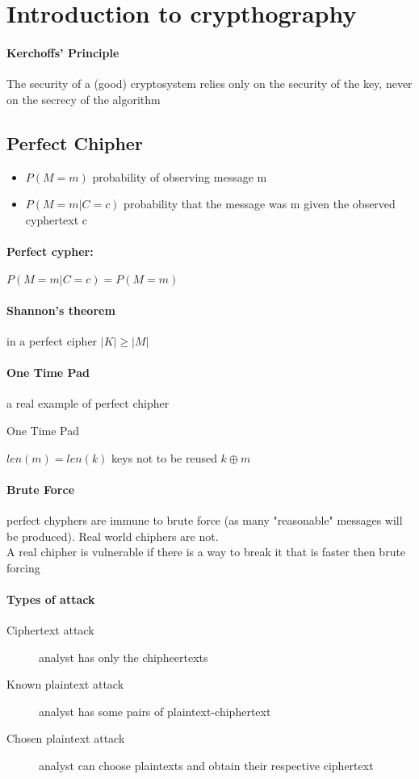 \documentclass{article}
\newcommand{\xor}{\oplus}
\begin{document}
\section{Introduction to crypthography}
\paragraph{Kerchoffs' Principle} The security of a (good) cryptosystem relies only on the security of the key, never on the secrecy of the algorithm
\subsection{Perfect Chipher}
\begin{itemize}
\item $P(M=m)$ probability of observing message m
\item $P(M=m|C=c)$ probability that the message was m given the observed cyphertext c
\end{itemize}
\paragraph{Perfect cypher: } $P(M=m|C=c)=P(M=m)$
\paragraph{Shannon's theorem} in a perfect cipher $|K|\geq |M|$
\paragraph{One Time Pad} a real example of perfect chipher
\begin{algorithm}
\caption{One Time Pad}
\begin{algorithmic}
\REQUIRE $len(m)=len(k)$
\REQUIRE keys not to be reused
\RETURN $k \xor m$
\end{algorithmic}
\end{algorithm} 

\paragraph{Brute Force} perfect chyphers are immune to brute force (as many "reasonable" messages will be produced). Real world chiphers are not.\\
A real chipher is vulnerable if there is a way to break it that is faster then brute forcing

\paragraph{Types of attack}
\begin{description}
\item[Ciphertext attack] analyst has only the chipheertexts
\item[Known plaintext attack] analyst has some pairs of plaintext-chiphertext
\item[Chosen plaintext attack] analyst can choose plaintexts and obtain their respective ciphertext
\end{description}
\end{document}
